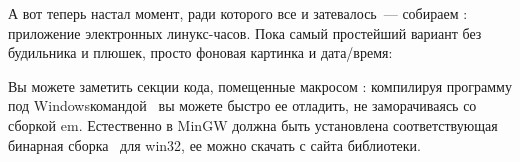 {

А вот теперь настал момент, ради которого все и затевалось\ --- собираем
: приложение электронных линукс-часов. Пока самый простейший
вариант без будильника и плюшек, просто фоновая картинка и дата/время:


Вы можете заметить секции кода, помещенные макросом : компилируя
программу под Windows\MinGW командой \ вы можете быстро
ее отладить, не заморачиваясь со сборкой em\linux. Естественно в MinGW должна
быть установлена соответствующая бинарная сборка \sdl\ для win32, ее можно
скачать с сайта библиотеки.

}{}
